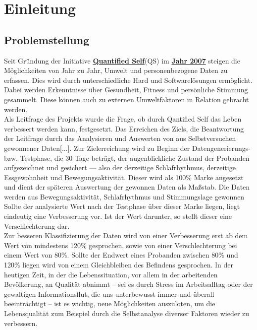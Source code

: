 
\chapter{Einleitung}
\label{ch:Einleitung}

\section{Problemstellung}
\label{ch:Einleitung:sec:problemstellung}

Seit Gründung der Initiative \href{http://quantifiedself.com/}{\textbf{Quantified Self}}(QS) im \href{http://quantifiedself.com/2011/03/what-is-the-quantified-self/}{\textbf{Jahr 2007}} steigen die Möglichkeiten von Jahr zu Jahr, Umwelt und personenbezogene Daten zu erfassen. 
Dies wird durch unterschiedliche Hard und Softwarelösungen ermöglicht. \\
Dabei werden Erkenntnisse über Gesundheit, Fitness und persönliche Stimmung gesammelt.
Diese können auch zu externen Umweltfaktoren in Relation gebracht werden. \\
Als Leitfrage des Projekts wurde die Frage, ob durch Qantified Self das Leben verbessert werden kann, festgesetzt. 
Das Erreichen des Ziels, die Beantwortung der Leitfrage durch das Analysieren und Auswerten von aus Selbstversuchen gewonnener Daten[...].
Zur Zielerreichung wird zu Beginn der Datengenerierungs- bzw. Testphase, die 30 Tage beträgt, der augenblickliche Zustand der Probanden aufgezeichnet und gesichert –– also der derzeitige Schlafrhythmus, derzeitige Essgewohnheit und Bewegungsaktivität. %
Dieser wird als 100\% Marke angesetzt und dient der späteren Auswertung der gewonnen Daten als Maßstab. 
Die Daten werden aus Bewegungsaktivität, Schlafrhythmus und Stimmungslage gewonnen 
Sollte der analysierte Wert nach der Testphase über dieser Marke liegen, liegt eindeutig eine Verbesserung vor. 
Ist der Wert darunter, so stellt dieser eine Verschlechterung dar. \\
Zur besseren Klassifizierung der Daten wird von einer Verbesserung erst ab dem Wert von mindestens 120\% gesprochen, sowie von einer Verschlechterung bei einem Wert von 80\%. Sollte der Endwert eines Probanden zwischen 80\% und 120\% liegen wird von einem Gleichbleiben des Befindens gesprochen.
In der heutigen Zeit, in der die Lebenssituation, vor allem in der arbeitenden Bevölkerung, an Qualität abnimmt – sei es durch Stress im Arbeitsalltag oder der gewaltigen Informationsflut, die uns unterbewusst immer und überall beeinträchtigt – ist es wichtig, neue Möglichkeiten auszuloten, um die Lebensqualität zum Beispiel durch die Selbstanalyse diverser Faktoren wieder zu verbessern. 

